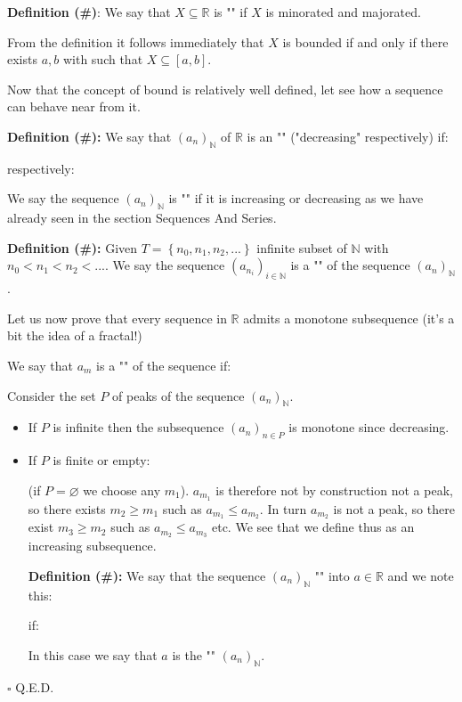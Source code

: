 	\textbf{Definition (\#\mydef)}: We say that $X\subseteq\mathbb{R} $ is "" if $X$ is minorated and majorated.
	
	From the definition it follows immediately that $X$ is bounded if and only if there exists $a,b$ with such that $X\subseteq [a,b]$.
	
	Now that the concept of bound is relatively well defined, let see how a sequence can behave near from it.
	
	\textbf{Definition (\#\mydef):} We say that $(a_n)_{\mathbb{N}}$ of $\mathbb{R}$ is an "" ("decreasing" respectively) if:
	
	respectively:
	
	We say the sequence $(a_n)_{\mathbb{N}}$ is "" if it is increasing or decreasing as we have already seen in the section Sequences And Series.
	
	\textbf{Definition (\#\mydef):} Given $T=\left\lbrace n_0,n_1,n_2,...\right\rbrace$ infinite subset of $\mathbb{N}$ with $n_0<n_1<n_2<...$. We say the sequence $(a_{n_i})_{i\in \mathbb{N}}$  is a "" of the sequence $(a_n)_{\mathbb{N}}$.
	
	\begin{theorem}
	Let us now prove that every sequence in $\mathbb{R}$ admits a monotone subsequence (it's a bit the idea of a fractal!)
	\end{theorem}
	\begin{dem}
	We say that $a_m$ is a "" of the sequence if:
	
	Consider the set $P$ of peaks of the sequence $(a_n)_{\mathbb{N}}$.
	\begin{itemize}
		\item If $P$ is infinite then the subsequence $(a_n)_{n\in P}$ is monotone since decreasing.
		
		\item If $P$ is finite or empty:
		
		(if $P=\varnothing$ we choose any $m_1$). $a_{m_1}$ is therefore not by construction not a peak, so there exists $m_2\geq m_1$ such as $a_{m_1}\leq a_{m_2}$. In turn $a_{m_2}$ is not a peak, so there exist $m_3\geq m_2$ such as $a_{m_2}\leq a_{m_3}$ etc. We see that we define thus as an increasing subsequence.
		
		\textbf{Definition (\#\mydef):} We say that the sequence $(a_n)_\mathbb{N}$ "" into $a\in \mathbb{R}$ and we note this:
		
		if:
		
		In this case we say that $a$ is the "" $(a_n)_\mathbb{N}$.
	\end{itemize}
	\begin{flushright}
		$\square$  Q.E.D.
	\end{flushright}
	\end{dem}
	
